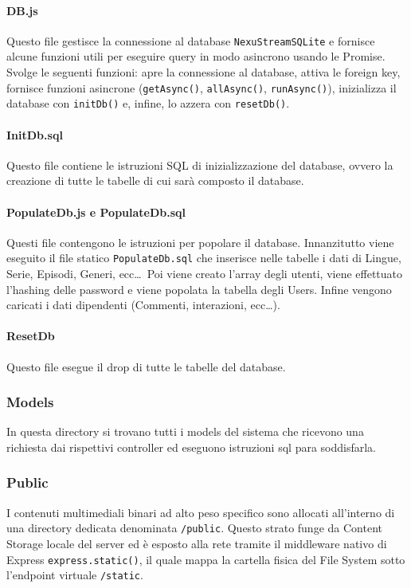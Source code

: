 \documentclass[11pt,a4paper]{article}
\begin{document}
\paragraph{DB.js}
Questo file gestisce la connessione al database \texttt{NexuStreamSQLite} e fornisce alcune funzioni utili per eseguire query in modo asincrono usando le Promise. Svolge le seguenti funzioni: apre la connessione al database, attiva le foreign key, fornisce funzioni asincrone (\texttt{getAsync()}, \texttt{allAsync()}, \texttt{runAsync()}), inizializza il database con \texttt{initDb()} e, infine, lo azzera con \texttt{resetDb()}.

\paragraph{InitDb.sql}
Questo file contiene le istruzioni SQL di inizializzazione del database, ovvero la creazione di tutte le tabelle di cui sarà composto il database.

\paragraph{PopulateDb.js e PopulateDb.sql}
Questi file contengono le istruzioni per popolare il database. Innanzitutto viene eseguito il file statico \texttt{PopulateDb.sql} che inserisce nelle tabelle i dati di Lingue, Serie, Episodi, Generi, ecc\dots\ Poi viene creato l’array degli utenti, viene effettuato l’hashing delle password e viene popolata la tabella degli Users. Infine vengono caricati i dati dipendenti (Commenti, interazioni, ecc\dots).

\paragraph{ResetDb}
Questo file esegue il drop di tutte le tabelle del database.

\subsubsection{Models}
In questa directory si trovano tutti i models del sistema che ricevono una richiesta dai rispettivi controller ed eseguono istruzioni sql para soddisfarla.

\subsubsection{Public}
I contenuti multimediali binari ad alto peso specifico sono allocati all'interno di una directory dedicata denominata \texttt{/public}. Questo strato funge da Content Storage locale del server ed è esposto alla rete tramite il middleware nativo di Express \texttt{express.static()}, il quale mappa la cartella fisica del File System sotto l'endpoint virtuale \texttt{/static}. 
\end{document}
